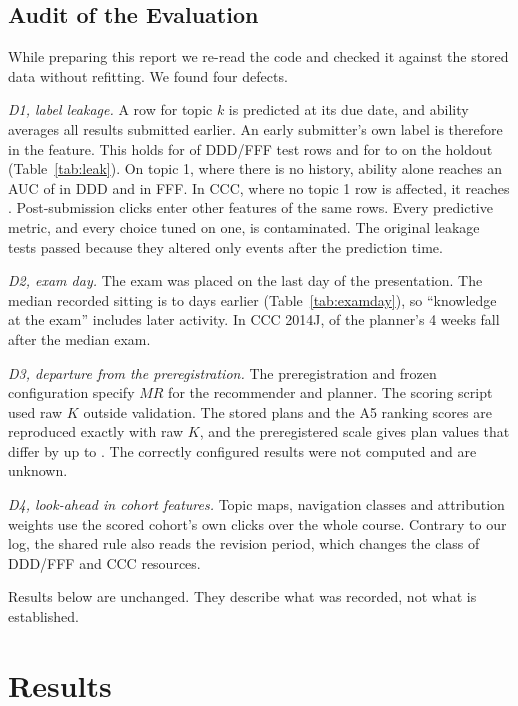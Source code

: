 \documentclass[conference]{IEEEtran}
\begin{document}
\subsection{Audit of the Evaluation}\label{sec:audit}
While preparing this report we re-read the code and checked it against the stored data without refitting. We found four defects.

\emph{D1, label leakage.} A row for topic $k$ is predicted at its due date, and ability averages all results submitted earlier. An early submitter's own label is therefore in the feature. This holds for \LeakMain{} of DDD/FFF test rows and for \LeakLow{} to \LeakHigh{} on the holdout (Table~\ref{tab:leak}). On topic 1, where there is no history, ability alone reaches an AUC of \LeakAucDDD{} in DDD and \LeakAucFFF{} in FFF. In CCC, where no topic 1 row is affected, it reaches \LeakAucCCC. Post-submission clicks enter other features of the same rows. Every predictive metric, and every choice tuned on one, is contaminated. The original leakage tests passed because they altered only events after the prediction time.

\emph{D2, exam day.} The exam was placed on the last day of the presentation. The median recorded sitting is \LateMin{} to \LateMax{} days earlier (Table~\ref{tab:examday}), so ``knowledge at the exam'' includes later activity. In CCC 2014J, \LateWeeksCCC{} of the planner's 4 weeks fall after the median exam.

\emph{D3, departure from the preregistration.} The preregistration and frozen configuration specify $MR$ for the recommender and planner. The scoring script used raw $K$ outside validation. The stored plans and the A5 ranking scores are reproduced exactly with raw $K$, and the preregistered scale gives plan values that differ by up to \ScaleGap. The correctly configured results were not computed and are unknown.

\emph{D4, look-ahead in cohort features.} Topic maps, navigation classes and attribution weights use the scored cohort's own clicks over the whole course. Contrary to our log, the shared rule also reads the revision period, which changes the class of \SitesMain{} DDD/FFF and \SitesCCC{} CCC resources.

Results below are unchanged. They describe what was recorded, not what is established.



\section{Results}
\end{document}

